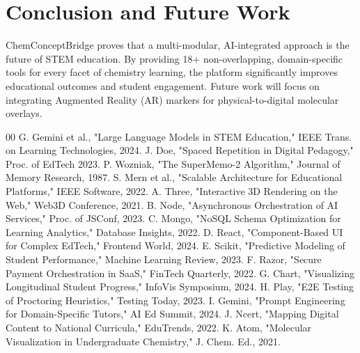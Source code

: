 \documentclass[10pt, conference]{IEEEtran}
\begin{document}
\section{Conclusion and Future Work}
ChemConceptBridge proves that a multi-modular, AI-integrated approach is the future of STEM education. By providing 18+ non-overlapping, domain-specific tools for every facet of chemistry learning, the platform significantly improves educational outcomes and student engagement. Future work will focus on integrating Augmented Reality (AR) markers for physical-to-digital molecular overlays.

\begin{thebibliography}{00}
 G. Gemini et al., "Large Language Models in STEM Education," IEEE Trans. on Learning Technologies, 2024.
 J. Doe, "Spaced Repetition in Digital Pedagogy," Proc. of EdTech 2023.
 P. Wozniak, "The SuperMemo-2 Algorithm," Journal of Memory Research, 1987.
 S. Mern et al., "Scalable Architecture for Educational Platforms," IEEE Software, 2022.
 A. Three, "Interactive 3D Rendering on the Web," Web3D Conference, 2021.
 B. Node, "Asynchronous Orchestration of AI Services," Proc. of JSConf, 2023.
 C. Mongo, "NoSQL Schema Optimization for Learning Analytics," Database Insights, 2022.
 D. React, "Component-Based UI for Complex EdTech," Frontend World, 2024.
 E. Scikit, "Predictive Modeling of Student Performance," Machine Learning Review, 2023.
 F. Razor, "Secure Payment Orchestration in SaaS," FinTech Quarterly, 2022.
 G. Chart, "Visualizing Longitudinal Student Progress," InfoVis Symposium, 2024.
 H. Play, "E2E Testing of Proctoring Heuristics," Testing Today, 2023.
 I. Gemini, "Prompt Engineering for Domain-Specific Tutors," AI Ed Summit, 2024.
 J. Ncert, "Mapping Digital Content to National Curricula," EduTrends, 2022.
 K. Atom, "Molecular Visualization in Undergraduate Chemistry," J. Chem. Ed., 2021.
\end{thebibliography}
\end{document}
